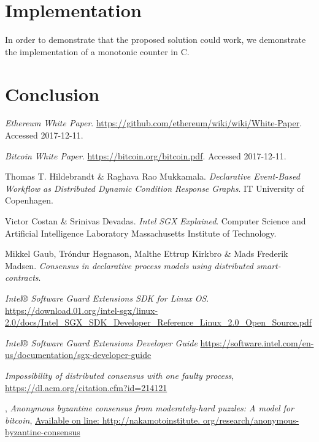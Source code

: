 \documentclass{article}
\newcommand\cpp{C\nolinebreak[4]\hspace{-.05em}\raisebox{.4ex}{\relsize{-3}{\textbf{++}}}}
\begin{document}
	\section{Implementation}

	In order to demonstrate that the proposed solution could work, we demonstrate the implementation of a monotonic counter in \cpp.

	\section{Conclusion}

	\begin{thebibliography}{9}

		\textit{Ethereum White Paper}.
		\url{https://github.com/ethereum/wiki/wiki/White-Paper}.
		Accessed 2017-12-11.

		\textit{Bitcoin White Paper}.
		\url{https://bitcoin.org/bitcoin.pdf}.
		Accessed 2017-12-11.

		Thomas T. Hildebrandt \& Raghava Rao Mukkamala.
		\textit{Declarative Event-Based Workflow as Distributed Dynamic Condition Response Graphs}.
		IT University of Copenhagen.

		Victor Costan \& Srinivas Devadas.
		\textit{Intel SGX Explained}.
		Computer Science and Artificial Intelligence Laboratory Massachusetts Institute of Technology.

		Mikkel Gaub, Tróndur Høgnason, Malthe Ettrup Kirkbro \& Mads Frederik Madsen.
		\textit{Consensus in declarative process models using distributed smart-contracts}.

		\textit{Intel® Software Guard Extensions SDK for Linux OS}.
		\url{https://download.01.org/intel-sgx/linux-2.0/docs/Intel_SGX_SDK_Developer_Reference_Linux_2.0_Open_Source.pdf}

		\textit{Intel® Software Guard Extensions Developer Guide}
		\url{https://software.intel.com/en-us/documentation/sgx-developer-guide}

		\textit{Impossibility of distributed consensus with one faulty process},
		\url{https://dl.acm.org/citation.cfm?id=214121}

		,
  		\textit{Anonymous byzantine consensus from moderately-hard puzzles: A model for bitcoin},
		\url{Available on line: http://nakamotoinstitute. org/research/anonymous-byzantine-consensus}

	\end{thebibliography}
\end{document}
